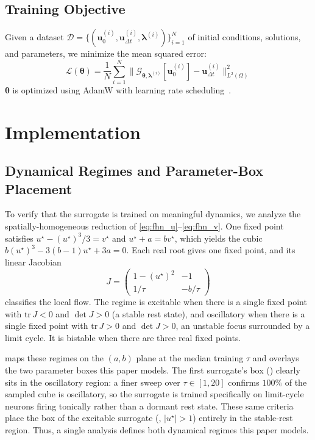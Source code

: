 \documentclass[runningheads]{llncs}
\begin{document}
\subsection{Training Objective}
\label{sec:training}

Given a dataset $\mathcal{D} = \{(\bm{u}_0^{(i)}, \bm{u}_{\Delta t}^{(i)}, \bm{\lambda}^{(i)})\}_{i=1}^N$ of initial conditions, solutions, and parameters, we minimize the mean squared error:
\begin{equation*}
    \mathcal{L}(\bm{\theta}) = \frac{1}{N} \sum_{i=1}^N \|\mathcal{G}_{\bm{\theta}, \bm{\lambda}^{(i)}}[\bm{u}_0^{(i)}] - \bm{u}_{\Delta t}^{(i)}\|_{L^2(\Omega)}^2
\end{equation*}
$\bm{\theta}$ is optimized using AdamW with learning rate scheduling~\cite{loshchilov2019decoupled}.

\FloatBarrier
\section{Implementation}
\label{sec:implementation}

\subsection{Dynamical Regimes and Parameter-Box Placement}
\label{sec:bifurcation}

To verify that the surrogate is trained on meaningful dynamics, we analyze the spatially-homogeneous reduction of \eqref{eq:fhn_u}--\eqref{eq:fhn_v}. One fixed point satisfies $u^\star - (u^\star)^3/3 = v^\star$ and $u^\star + a = b v^\star$, which yields the cubic $b (u^\star)^3 - 3(b-1) u^\star + 3 a = 0$. Each real root gives one fixed point, and its linear Jacobian
\begin{equation*}
J = \begin{pmatrix} 1 - (u^\star)^2 & -1 \\ 1/\tau & -b/\tau \end{pmatrix}
\end{equation*}
classifies the local flow. The regime is excitable when there is a single fixed point with $\mathrm{tr}\,J < 0$ and $\det J > 0$ (a stable rest state), and oscillatory when there is a single fixed point with $\mathrm{tr}\,J > 0$ and $\det J > 0$, an unstable focus surrounded by a limit cycle. It is bistable when there are three real fixed points.

 maps these regimes on the $(a, b)$ plane at the median training $\tau$ and overlays the two parameter boxes this paper models. The first surrogate's box () clearly sits in the oscillatory region: a finer sweep over $\tau \in [1, 20]$ confirms $100\%$ of the sampled cube is oscillatory, so the surrogate is trained specifically on limit-cycle neurons firing tonically rather than a dormant rest state. These same criteria place the box of the excitable surrogate (, $|u^\star| > 1$) entirely in the stable-rest region. Thus, a single analysis defines both dynamical regimes this paper models.
\end{document}
